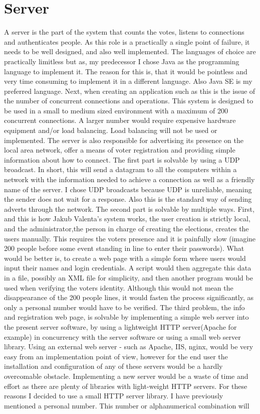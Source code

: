 \documentclass[11pt,twoside,a4paper]{book}
\begin{document}
\section{Server}
A server is the part of the system that counts the votes, listens to connections and authenticates people. As this role is a practically a single point of failure, it needs to be well designed, and also well implemented. The languages of choice are practically limitless but as, my predecessor I chose Java as the programming language to implement it. The reason for this is, that it would be pointless and very time consuming to implement it in a different language. Also Java SE is my preferred language. Next, when creating an application such as this is the issue of the number of concurrent connections and operations. This system is designed to be used in a small to medium sized environment with  a maximum of 200 concurrent connections. A larger number would require expensive hardware equipment and/or load balancing. Load balancing will not be used or implemented. The server is also responsible for advertising its presence on the local area network, offer a means of voter registration and providing simple information about how to connect. The first part is solvable by using a UDP\cite{whatIsUPD} broadcast\cite{whatIsBroadcasting}. In short, this will send a datagram to all the computers within a network with the information needed to achieve a connection as well as a friendly name of the server. I chose UDP broadcasts because UDP is unreliable, meaning the sender does not wait for a response. Also this is the standard way of sending adverts through the network. The second part is solvable by multiple ways. First, and this is how Jakub Valenta's system works, the user creation is strictly local, and the administrator,the person in charge of creating the elections, creates the users manually. This requires the voters presence and  it is painfully slow (imagine 200 people before some event standing in line to enter their passwords). What would be better is, to create a web page with a simple form where users would input their names and login credentials. A script would then aggregate this data in a file, possibly an XML file for simplicity, and then another program would be used when verifying the voters identity. Although this would not mean the disappearance of the 200 people lines, it would fasten the process significantly, as only a personal number would have to be verified. The third problem, the info and registration web page, is solvable by implementing a simple web server into the present server software, by using a lightweight HTTP server(Apache for example)  in concurrency with the server software or using a small web server library. Using an external web server - such as Apache, IIS, nginx, would be very easy from an implementation point of view, however for the end user the installation and configuration of any of these servers would be a hardly overcomable obstacle. Implementing a new server would be a waste of time and effort as there are plenty of libraries with light-weight HTTP servers. For these reasons I decided to use a small HTTP server library. I have previously mentioned a personal number. This number or alphanumerical combination will 
\end{document}
